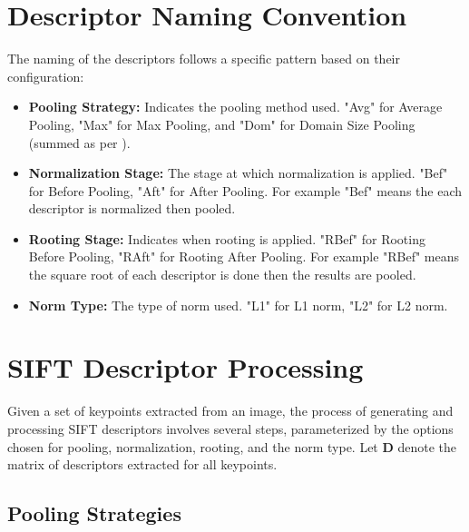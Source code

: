 \section*{Descriptor Naming Convention}

The naming of the descriptors follows a specific pattern based on their configuration:

\begin{itemize}
    \item \textbf{Pooling Strategy:} Indicates the pooling method used. "Avg" for Average Pooling, "Max" for Max Pooling, and "Dom" for Domain Size Pooling (summed as per \cite{dong2015domain}).
    \item \textbf{Normalization Stage:} The stage at which normalization is applied. "Bef" for Before Pooling, "Aft" for After Pooling. For example "Bef" means the each descriptor is normalized then pooled.
    \item \textbf{Rooting Stage:} Indicates when rooting is applied. "RBef" for Rooting Before Pooling, "RAft" for Rooting After Pooling. For example "RBef" means the square root of each descriptor is done then the results are pooled.
    \item \textbf{Norm Type:} The type of norm used. "L1" for L1 norm, "L2" for L2 norm.
\end{itemize}

\section*{SIFT Descriptor Processing}

Given a set of keypoints extracted from an image, the process of generating and processing SIFT descriptors involves several steps, parameterized by the options chosen for pooling, normalization, rooting, and the norm type. Let $\mathbf{D}$ denote the matrix of descriptors extracted for all keypoints.

\subsection*{Pooling Strategies}


